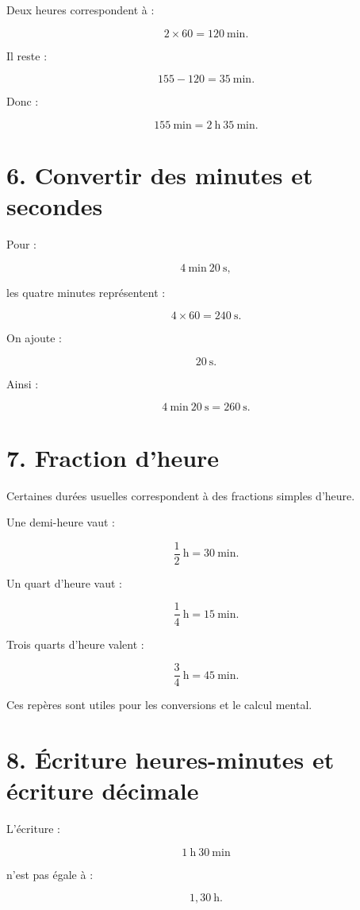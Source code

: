 Deux heures correspondent à :

\[
2\times60=120\ \text{min}.
\]

Il reste :

\[
155-120=35\ \text{min}.
\]

Donc :

\[
\boxed{
155\ \text{min}
=
2\ \text{h}\ 35\ \text{min}
}.
\]

\section{6. Convertir des minutes et secondes}

Pour :

\[
4\ \text{min}\ 20\ \text{s},
\]

les quatre minutes représentent :

\[
4\times60=240\ \text{s}.
\]

On ajoute :

\[
20\ \text{s}.
\]

Ainsi :

\[
\boxed{
4\ \text{min}\ 20\ \text{s}
=
260\ \text{s}
}.
\]

\section{7. Fraction d’heure}

Certaines durées usuelles correspondent à des fractions simples d’heure.

Une demi-heure vaut :

\[
\dfrac{1}{2}\ \text{h}=30\ \text{min}.
\]

Un quart d’heure vaut :

\[
\dfrac{1}{4}\ \text{h}=15\ \text{min}.
\]

Trois quarts d’heure valent :

\[
\dfrac{3}{4}\ \text{h}=45\ \text{min}.
\]

Ces repères sont utiles pour les conversions et le calcul mental.

\section{8. Écriture heures-minutes et écriture décimale}

L’écriture :

\[
1\ \text{h}\ 30\ \text{min}
\]

n’est pas égale à :

\[
1{,}30\ \text{h}.
\]

